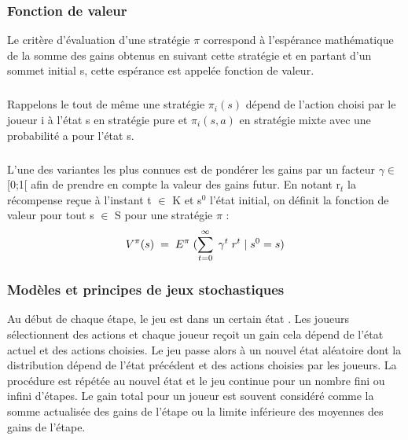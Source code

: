 \documentclass[a4paper, 12pt, twoside]{article}
\begin{document}
{{\subsubsection{Fonction de valeur}
Le critère d'évaluation d'une stratégie $\pi$ correspond à l'espérance mathématique de la somme des gains obtenus en suivant cette stratégie et en partant d’un sommet initial \textsf{s},  cette espérance est appelée \textsf{fonction de valeur}.

\subparagraph*{}{Rappelons le tout de même une stratégie $\pi_{i}(s)$ dépend de l'action choisi par le joueur \textsf{i} à l'état \textsf{s} en stratégie pure et $\pi_{i}(s,a)$ en stratégie mixte avec une probabilité \textsf{a} pour l'état \textsf{s}}.

\subparagraph*{}{L'une des variantes les plus connues est de pondérer les gains par un facteur $\gamma \in $ [0;1[ afin de prendre en compte la valeur des gains futur. En notant r$_{t}$ la récompense reçue à l'instant \textsf{t} $ \in $ K et \textsf{s$^{0}$} l'état initial, on définit la \textsf{fonction de valeur} pour tout \textsf{s} $\in $ S pour une stratégie $ \pi$ :}
\begin{align*}
V^{\pi}(s) \hspace{0,1 cm} = \hspace{0,1 cm} E^{\pi}\hspace{0,1 cm} (\sum_{t=0}^{\infty} \hspace{0,1cm}\gamma ^{t} \hspace{0,1cm} r^{t}\hspace{0,1cm} |\hspace{0,1cm} s^{0} = s )
\end{align*}


\subsubsection{Modèles et principes de jeux stochastiques }
Au début de chaque étape, le jeu est dans un certain état . Les joueurs sélectionnent des actions et chaque joueur reçoit un gain cela dépend de l'état actuel et des actions choisies. Le jeu passe alors à un nouvel état aléatoire dont la distribution dépend de l'état précédent et des actions choisies par les joueurs. La procédure est répétée au nouvel état et le jeu continue pour un nombre fini ou infini d'étapes. Le gain total pour un joueur est souvent considéré comme la somme actualisée des gains de l'étape ou la limite inférieure des moyennes des gains de l'étape.

}}
\end{document}
